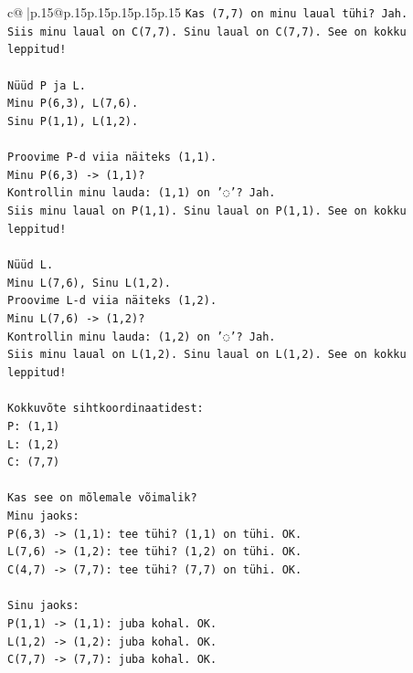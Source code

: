 \documentclass{article}
\begin{document}
{\begin{supertabular}{c@{$\;$}|p{.15\linewidth}@{}p{.15\linewidth}p{.15\linewidth}p{.15\linewidth}p{.15\linewidth}p{.15\linewidth}}
{{{\texttt{Kas (7,7) on minu laual tühi? Jah.} \\
\texttt{Siis minu laual on C(7,7). Sinu laual on C(7,7). See on kokku leppitud!} \\
\\ 
\texttt{Nüüd P ja L.} \\
\texttt{Minu P(6,3), L(7,6).} \\
\texttt{Sinu P(1,1), L(1,2).} \\
\\ 
\texttt{Proovime P{-}d viia näiteks (1,1).} \\
\texttt{Minu P(6,3) {-}> (1,1)?} \\
\texttt{Kontrollin minu lauda: (1,1) on '◌'? Jah.} \\
\texttt{Siis minu laual on P(1,1). Sinu laual on P(1,1). See on kokku leppitud!} \\
\\ 
\texttt{Nüüd L.} \\
\texttt{Minu L(7,6), Sinu L(1,2).} \\
\texttt{Proovime L{-}d viia näiteks (1,2).} \\
\texttt{Minu L(7,6) {-}> (1,2)?} \\
\texttt{Kontrollin minu lauda: (1,2) on '◌'? Jah.} \\
\texttt{Siis minu laual on L(1,2). Sinu laual on L(1,2). See on kokku leppitud!} \\
\\ 
\texttt{Kokkuvõte sihtkoordinaatidest:} \\
\texttt{P: (1,1)} \\
\texttt{L: (1,2)} \\
\texttt{C: (7,7)} \\
\\ 
\texttt{Kas see on mõlemale võimalik?} \\
\texttt{Minu jaoks:} \\
\texttt{P(6,3) {-}> (1,1): tee tühi? (1,1) on tühi. OK.} \\
\texttt{L(7,6) {-}> (1,2): tee tühi? (1,2) on tühi. OK.} \\
\texttt{C(4,7) {-}> (7,7): tee tühi? (7,7) on tühi. OK.} \\
\\ 
\texttt{Sinu jaoks:} \\
\texttt{P(1,1) {-}> (1,1): juba kohal. OK.} \\
\texttt{L(1,2) {-}> (1,2): juba kohal. OK.} \\
\texttt{C(7,7) {-}> (7,7): juba kohal. OK.} \\
}}}
\end{supertabular}}
\end{document}
